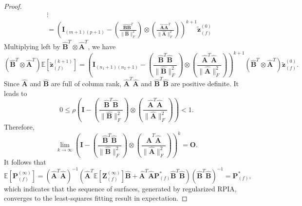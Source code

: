 \documentclass[11pt]{article}
\numberwithin{equation}{section}
\begin{document}
\begin{proof}
$$\begin{aligned}
& \vdots \\
&=\left(\boldsymbol{I}_{(m+1)(p+1)}-\left(\frac{\hat{\boldsymbol{B}} \hat{\boldsymbol{B}}^{T}}{\|\hat{\boldsymbol{B}}\|_{F}^{2}}\right) \otimes\left(\frac{\hat{\boldsymbol{A}} \hat{\boldsymbol{A}}^{T}}{\|\hat{\boldsymbol{A}}\|_{F}^{2}}\right)\right)^{k+1} \widetilde{\mathbf{z}}_{(f)}^{(0)}
\end{aligned}
$$
Multiplying left by $\hat{\boldsymbol{B}}^{T} \otimes \hat{\boldsymbol{A}}^{T}$, we have
$$
\left(\hat{\boldsymbol{B}}^{T} \otimes \hat{\boldsymbol{A}}^{T}\right) \mathbb{E}\left[\widetilde{\boldsymbol{z}}_{(f)}^{(k+1)}\right]=\left(\boldsymbol{I}_{\left(n_{1}+1\right)\left(n_{2}+1\right)}-\left(\frac{\hat{\boldsymbol{B}}^{T} \hat{\boldsymbol{B}}}{\|\hat{\boldsymbol{B}}\|_{F}^{2}}\right) \otimes\left(\frac{\hat{\boldsymbol{A}}^{T} \hat{\boldsymbol{A}}}{\|\hat{\boldsymbol{A}}\|_{F}^{2}}\right)\right)^{k+1}\left(\hat{\boldsymbol{B}}^{T} \otimes \hat{\boldsymbol{A}}^{T}\right) \widetilde{\boldsymbol{z}}_{(f)}^{(0)} .
$$
Since $\hat{\boldsymbol{A}}$ and $\hat{\boldsymbol{B}}$ are full of column rank, $\hat{\boldsymbol{A}}^{T} \hat{\boldsymbol{A}}$ and $\hat{\boldsymbol{B}}^{T} \hat{\boldsymbol{B}}$ are positive definite. It leads to
$$
0 \leq \rho\left(\boldsymbol{I}-\left(\frac{\hat{\boldsymbol{B}}^{T} \hat{\boldsymbol{B}}}{\|\hat{\boldsymbol{B}}\|_{F}^{2}}\right) \otimes\left(\frac{\hat{\boldsymbol{A}}^{T} \hat{\boldsymbol{A}}}{\|\hat{\boldsymbol{A}}\|_{F}^{2}}\right)\right)<1 .
$$
Therefore,
$$
\lim _{k \rightarrow \infty}\left(\boldsymbol{I}-\left(\frac{\hat{\boldsymbol{B}}^{T} \hat{\boldsymbol{B}}}{\|\hat{\boldsymbol{B}}\|_{F}^{2}}\right) \otimes\left(\frac{\hat{\boldsymbol{A}}^{T} \hat{\boldsymbol{A}}}{\|\hat{\boldsymbol{A}}\|_{F}^{2}}\right)\right)^{k}=\boldsymbol{O} .
$$
It follows that
$$
\mathbb{E}\left[\boldsymbol{P}_{(f)}^{(\infty)}\right]=\left(\hat{\boldsymbol{A}}^{T} \hat{\boldsymbol{A}}\right)^{-1}\left(\hat{\boldsymbol{A}}^{T} \mathbb{E}\left[\boldsymbol{Z}_{(f)}^{(\infty)}\right] \hat{\boldsymbol{B}}+\hat{\boldsymbol{A}}^{T} \hat{\boldsymbol{A}} \boldsymbol{P}_{(f)}^{*} \hat{\boldsymbol{B}}^{T} \hat{\boldsymbol{B}}\right)\left(\hat{\boldsymbol{B}}^{T} \hat{\boldsymbol{B}}\right)^{-1}=\boldsymbol{P}_{(f)}^{*},
$$
which indicates that the sequence of surfaces, generated by regularized RPIA, converges to the least-squares fitting result in expectation.


\end{proof}
\end{document}
